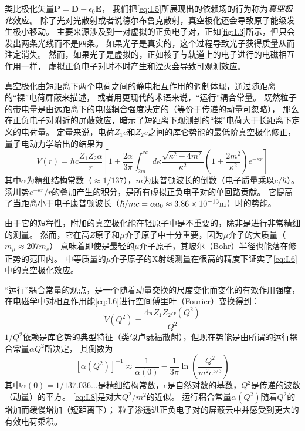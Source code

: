 \documentclass[12pt]{book}
\numberwithin{equation}{chapter}
\numberwithin{figure}{chapter}
\numberwithin{footnote}{page}
\begin{document}
类比极化矢量$\mathbf{P}=\mathbf{D}-\epsilon_0\mathbf{E}$，
我们把\autoref{eq:I.5}所展现出的依赖场的行为称为\textit{真空极化}效应。
除了光对光散射或者说德尔布鲁克散射，真空极化还会导致原子能级发生极小移动。
主要来源涉及到一对虚拟的正负电子对，正如\autoref{fig:I.3}所示，但只会发出两条光线而不是四条。
如果光子是真实的，这个过程导致光子获得质量从而注定消失。
然而，如果光子是虚拟的，正如核子与轨道上的电子进行的电磁相互作用一样，
虚拟正负电子对时不时产生和湮灭会导致可观测效应。

真空极化由短距离下两个电荷之间的静电相互作用的调制体现，通过随距离的“裸”电荷屏蔽来描述，
或者用更现代的术语来说，“运行”耦合常量。
既然粒子的带电量是由远距离下的电磁耦合强度决定的（等价于传递的动量可忽略），
那么在正负电子对附近的屏蔽效应，暗示了短距离下观测到的“裸”电荷大于长距离下定义的电荷量。
定量来说，电荷$Z_1e$和$Z_2e$之间的库仑势能的最低阶真空极化修正，量子电动力学给出的结果为
\begin{equation}\label{eq:I.6}
    V(r)=\hbar c\frac{Z_1Z_2\alpha}{r}[1+\frac{2\alpha}{3\pi}\int_{2m}^{\infty} d\kappa \frac{\sqrt{\kappa^2-4m^2}}{\kappa^2}(1+\frac{2m^2}{\kappa^2})e^{-\kappa r} ]
\end{equation}
其中$\alpha$为精细结构常数（$\approx 1/137$），$m$为康普顿波长的倒数（电子质量乘以$c/\hbar$）。
汤川势$e^{-\kappa r}/r$的叠加产生的积分，是所有虚拟正负电子对的单回路贡献。
它提高了当距离小于电子康普顿波长（$\hbar/mc=\alpha a_0\approx 3.86\times 10^{-13}{\rm m}$）时的势能。

由于它的短程性，附加的真空极化能在轻原子中是不重要的，除非是进行非常精细的测量。
然而，它在高$Z$原子和$\mu$介子原子中十分重要，因为$\mu$介子的大质量（$m_{\mu}\approx 207m_e$）
意味着即使是最轻的$\mu$介子原子，其玻尔（Bohr）半径也能落在修正势的范围内。
中等质量的$\mu$介子原子的X射线测量在很高的精度下证实了\autoref{eq:I.6}中的真空极化效应。

“运行”耦合常量的观点，是一个随着动量交换的尺度变化而变化的有效作用强度，
在电磁学中对相互作用能\autoref{eq:I.6}进行空间傅里叶（Fourier）变换得到：
\begin{equation}\label{eq:I.7}
    \tilde{V}(Q^2)=\frac{4\pi Z_1Z_2\alpha(Q^2)}{Q^2}
\end{equation}
$1/Q^2$依赖是库仑势的典型特征（类似卢瑟福散射），但现在势能是由所谓的运行耦合常量$\alpha{Q^2}$所决定，
其倒数为
\begin{equation}\label{eq:I.8}
    [\alpha(Q^2)]^{-1}\approx \frac{1}{\alpha(0)}-\frac{1}{3\pi}\ln(\frac{Q^2}{m^2e^{5/3}})
\end{equation}
其中$\alpha(0)=1/137.036\dots$是精细结构常数，$e$是自然对数的基数，$Q^2$是传递的波数（动量）的平方。
\autoref{eq:I.8}是对大$Q^2/m^2$的近似。
运行耦合常量$\alpha(Q^2)$随着$Q^2$的增加而缓慢增加（短距离下）；
粒子渗透进正负电子对的屏蔽云中并感受到更大的有效电荷乘积。
\end{document}
